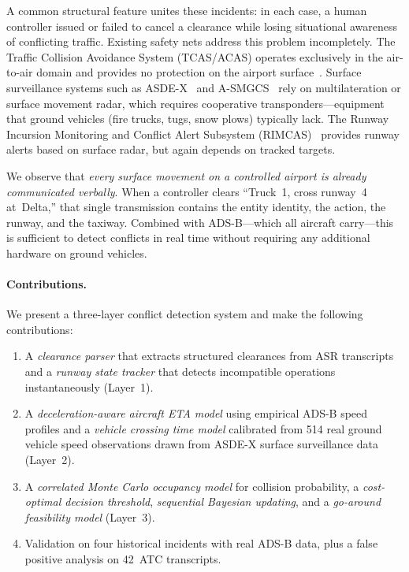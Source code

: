 \documentclass[11pt,a4paper]{article}
\begin{document}
A common structural feature unites these incidents: in each case, a human controller issued or failed to cancel a clearance while losing situational awareness of conflicting traffic.
Existing safety nets address this problem incompletely.
The Traffic Collision Avoidance System (TCAS/ACAS) operates exclusively in the air-to-air domain and provides no protection on the airport surface~\citep{kuchar2007tcas}.
Surface surveillance systems such as ASDE-X~\citep{faa2020asdex} and A-SMGCS~\citep{eurocontrol2004asmgcs} rely on multilateration or surface movement radar, which requires cooperative transponders---equipment that ground vehicles (fire trucks, tugs, snow plows) typically lack.
The Runway Incursion Monitoring and Conflict Alert Subsystem (RIMCAS)~\citep{eurocontrol2010rimcas} provides runway alerts based on surface radar, but again depends on tracked targets.

We observe that \emph{every surface movement on a controlled airport is already communicated verbally}.
When a controller clears ``Truck~1, cross runway~4 at~Delta,'' that single transmission contains the entity identity, the action, the runway, and the taxiway.
Combined with ADS-B---which all aircraft carry---this is sufficient to detect conflicts in real time without requiring any additional hardware on ground vehicles.

\paragraph{Contributions.}
We present a three-layer conflict detection system and make the following contributions:
\begin{enumerate}[nosep]
    \item A \emph{clearance parser} that extracts structured clearances from ASR transcripts and a \emph{runway state tracker} that detects incompatible operations instantaneously (Layer~1).
    \item A \emph{deceleration-aware aircraft ETA model} using empirical ADS-B speed profiles and a \emph{vehicle crossing time model} calibrated from 514 real ground vehicle speed observations drawn from ASDE-X surface surveillance data (Layer~2).
    \item A \emph{correlated Monte Carlo occupancy model} for collision probability, a \emph{cost-optimal decision threshold}, \emph{sequential Bayesian updating}, and a \emph{go-around feasibility model} (Layer~3).
    \item Validation on four historical incidents with real ADS-B data, plus a false positive analysis on 42~ATC transcripts.
\end{enumerate}
\end{document}

